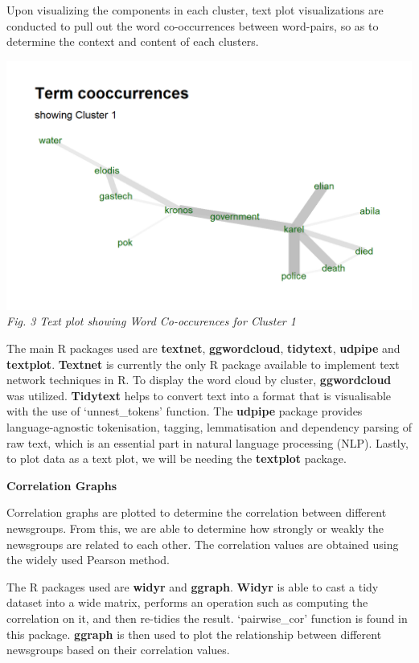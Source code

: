 \documentclass{acm_proc_article-sp}
\begin{document}
Upon visualizing the components in each cluster, text plot
visualizations are conducted to pull out the word co-occurrences between
word-pairs, so as to determine the context and content of each clusters.

\includegraphics{img/image05.png} \emph{Fig. 3 Text plot showing Word
Co-occurences for Cluster 1}

The main R packages used are \textbf{textnet}, \textbf{ggwordcloud},
\textbf{tidytext}, \textbf{udpipe} and \textbf{textplot}.
\textbf{Textnet} is currently the only R package available to implement
text network techniques in R. To display the word cloud by cluster,
\textbf{ggwordcloud} was utilized. \textbf{Tidytext} helps to convert
text into a format that is visualisable with the use of `unnest\_tokens'
function. The \textbf{udpipe} package provides language-agnostic
tokenisation, tagging, lemmatisation and dependency parsing of raw text,
which is an essential part in natural language processing (NLP). Lastly,
to plot data as a text plot, we will be needing the \textbf{textplot}
package.

\textbf{Correlation Graphs}

Correlation graphs are plotted to determine the correlation between
different newsgroups. From this, we are able to determine how strongly
or weakly the newsgroups are related to each other. The correlation
values are obtained using the widely used Pearson method.

The R packages used are \textbf{widyr} and \textbf{ggraph}.
\textbf{Widyr} is able to cast a tidy dataset into a wide matrix,
performs an operation such as computing the correlation on it, and then
re-tidies the result. `pairwise\_cor' function is found in this package.
\textbf{ggraph} is then used to plot the relationship between different
newsgroups based on their correlation values.
\end{document}
